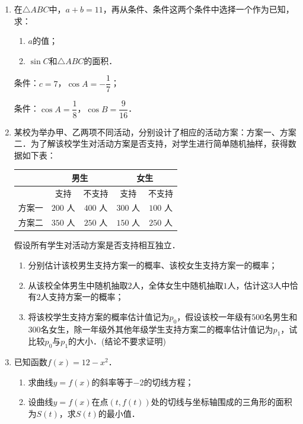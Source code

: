 \begin{description}
\begin{enumerate}[leftmargin=5pt]
        \item 在$\triangle ABC$中，$a+b=11$，再从条件、条件这两个条件中选择一个作为已知，求：
        \begin{enumerate}[label=(\arabic*)]
            \item $a$的值；
            \item $\sin C$和$\triangle ABC$的面积．
        \end{enumerate}
        条件：$c=7$，$\cos A=-\dfrac{1}{7}$；

        条件：$\cos A=\dfrac{1}{8}$，$\cos B=\dfrac{9}{16}$．

        \item 某校为举办甲、乙两项不同活动，分别设计了相应的活动方案：方案一、方案二．为了解该校学生对活动方案是否支持，对学生进行简单随机抽样，获得数据如下表：
        \begin{center}
\begin{tabular}{c|cc|cc}
\hline
& \multicolumn{2}{c|}{男生} & \multicolumn{2}{c}{女生} \\
\hline
& 支持 & 不支持 & 支持 & 不支持 \\
\hline
方案一 & $200\text{ 人}$ & $400\text{ 人}$ & $300\text{ 人}$ & $100\text{ 人}$ \\
方案二 & $350\text{ 人}$ & $250\text{ 人}$ & $150\text{ 人}$ & $250\text{ 人}$ \\
\hline
\end{tabular}
\end{center}
        假设所有学生对活动方案是否支持相互独立．
        \begin{enumerate}[label=(\arabic*)]
            \item 分别估计该校男生支持方案一的概率、该校女生支持方案一的概率；
            \item 从该校全体男生中随机抽取$2$人，全体女生中随机抽取$1$人，估计这$3$人中恰有$2$人支持方案一的概率；
            \item 将该校学生支持方案的概率估计值记为$p_0$，假设该校一年级有$500$名男生和$300$名女生，除一年级外其他年级学生支持方案二的概率估计值记为$p_1$，试比较$p_0$与$p_1$的大小．(结论不要求证明)
        \end{enumerate}

        \item 已知函数$f(x)=12-x^2$．
        \begin{enumerate}[label=(\arabic*)]
            \item 求曲线$y=f(x)$的斜率等于$-2$的切线方程；
            \item 设曲线$y=f(x)$在点$(t,f(t))$处的切线与坐标轴围成的三角形的面积为$S(t)$，求$S(t)$的最小值．
        \end{enumerate}


\end{enumerate}
\end{description}
